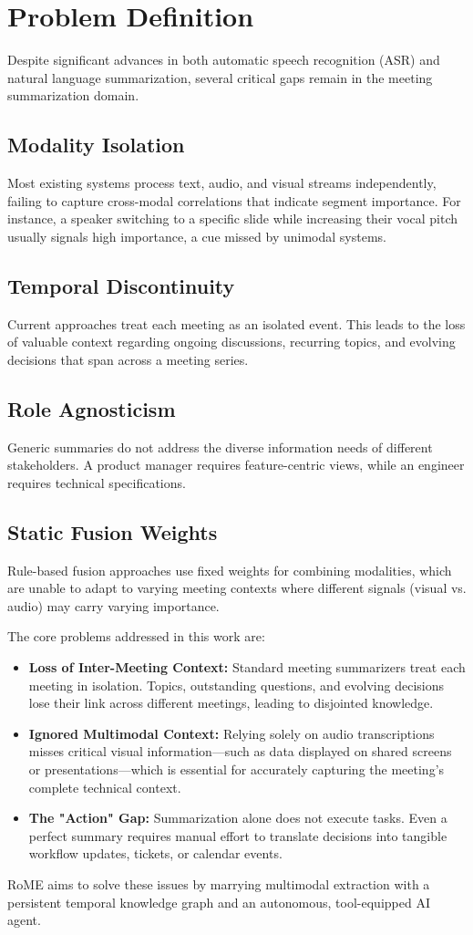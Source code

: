 \chapter{Problem Definition}
\noindent
Despite significant advances in both automatic speech recognition (ASR) and natural language summarization, several critical gaps remain in the meeting summarization domain.

\section{Modality Isolation}
Most existing systems process text, audio, and visual streams independently, failing to capture cross-modal correlations that indicate segment importance. For instance, a speaker switching to a specific slide while increasing their vocal pitch usually signals high importance, a cue missed by unimodal systems.

\section{Temporal Discontinuity}
Current approaches treat each meeting as an isolated event. This leads to the loss of valuable context regarding ongoing discussions, recurring topics, and evolving decisions that span across a meeting series.

\section{Role Agnosticism}
Generic summaries do not address the diverse information needs of different stakeholders. A product manager requires feature-centric views, while an engineer requires technical specifications. 

\section{Static Fusion Weights}
Rule-based fusion approaches use fixed weights for combining modalities, which are unable to adapt to varying meeting contexts where different signals (visual vs. audio) may carry varying importance.

The core problems addressed in this work are:
\begin{itemize}
    \item \textbf{Loss of Inter-Meeting Context:} Standard meeting summarizers treat each meeting in isolation. Topics, outstanding questions, and evolving decisions lose their link across different meetings, leading to disjointed knowledge.
    \item \textbf{Ignored Multimodal Context:} Relying solely on audio transcriptions misses critical visual information—such as data displayed on shared screens or presentations—which is essential for accurately capturing the meeting's complete technical context.
    \item \textbf{The "Action" Gap:} Summarization alone does not execute tasks. Even a perfect summary requires manual effort to translate decisions into tangible workflow updates, tickets, or calendar events.
\end{itemize}
RoME aims to solve these issues by marrying multimodal extraction with a persistent temporal knowledge graph and an autonomous, tool-equipped AI agent.
